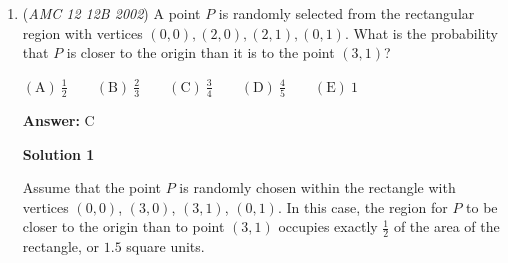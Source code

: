 \begin{enumerate}
\textbf{Solution 2}

WLOG, we can set values of their lawns' areas and their owners' speeds. Let the area of Andy's lawn be $6$ units, Beth's lawn be $3$ units, and Carlos's lawn be $2$ units. Let Carlos's mowing area per hour (honestly the time you set won't matter) be $1$, let Beth's mowing area per hour be $2$, and let Andy's mowing area per hour be $3$. Now, we can easily calculate their time  by dividing their lawns' areas by their respective owners' speeds. Andy's time is $\frac{6}{3} = 2$ hours, Beth's time is $\frac{3}{2} = 1.5$ hours, and Carlos's time is $\frac{6}{3} = 2$ hours. Our answer is clearly $\boxed{\mathrm{(B)}\ \text{Beth}}$.~Solution by virjoy2001

 



\textbf{Solution 3(convert into a racing problem)}

We first set the area for Carlo's lawn to $x$. That leads to Beth's lawn's area to be $3x$ and Andy's lawn $6x$. After that, we set the speed of Carlo's lawn mower to $y$. We then get Beth's speed in terms of $y$, which is $2y$. Andy's lawn mower's speed is $3y$. WLOG, we set the width of their lawns to $0$. We then can imagine that it's a racetrack, with the distance being the area of their lawns, and they are competing with different speeds and distances. We then proceed by applying the speed formula, distance = speed*time. Using WLOG again, we can set Carlo's speed to $10$ mph and we can assume Carlo's lawn, leaving Beth with $20$ mph/$3$miles and Andy with $30$ mph/$6$ miles. After plugging in the variables, we clearly see that $\boxed{\mathrm{(B)}\ \text{Beth}}$ will win.~Calvin67

 


	\item (\textit{AMC 12 12B 2002}) A point $P$ is randomly selected from the rectangular region with vertices $(0,0),(2,0),(2,1),(0,1)$. What is the probability that $P$ is closer to the origin than it is to the point $(3,1)$?


 

$\mathrm{(A)}\ \frac 12 \qquad\mathrm{(B)}\ \frac 23 \qquad\mathrm{(C)}\ \frac 34 \qquad\mathrm{(D)}\ \frac 45 \qquad\mathrm{(E)}\ 1$

 \textbf{Answer: }C



\textbf{Solution 1}

Assume that the point $P$ is randomly chosen within the rectangle with vertices $(0,0)$, $(3,0)$, $(3,1)$, $(0,1)$. In this case, the region for $P$ to be closer to the origin than to point $(3,1)$ occupies exactly $\frac{1}{2}$ of the area of the rectangle, or $1.5$ square units.


\end{enumerate}
